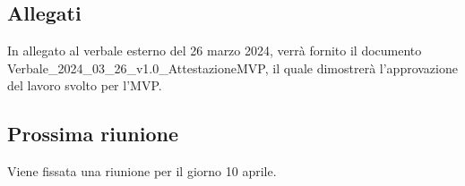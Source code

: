 \subsection{Allegati}
In allegato al verbale esterno del 26 marzo 2024, verrà fornito il documento\\ Verbale\_2024\_03\_26\_v1.0\_AttestazioneMVP, il quale dimostrerà l'approvazione del lavoro svolto per l'MVP.

\subsection{Prossima riunione} \label{subsec:riunione}
Viene fissata una riunione per il giorno 10 aprile.

